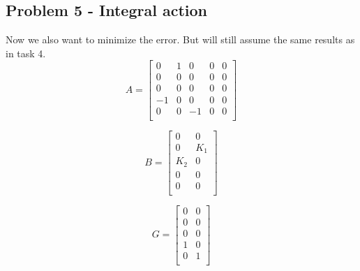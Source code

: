 \subsection{Problem 5 - Integral action}
Now we also want to minimize the error. But will still assume the same results as in task 4.
\begin{equation*}
    A =
    \begin{bmatrix}
        0 & 1 & 0 & 0 & 0 \\
        0 & 0 & 0 & 0 & 0 \\
        0 & 0 & 0 & 0 & 0 \\
        -1 & 0 & 0 & 0 & 0 \\
        0 & 0 & -1 & 0 & 0 \\
    \end{bmatrix}
\end{equation*}

\begin{equation*}
    B =
    \begin{bmatrix}
        0 & 0 \\
        0 & K_1 \\
        K_2 & 0 \\
        0 & 0 \\
        0 & 0 \\
    \end{bmatrix}
\end{equation*}

\begin{equation*}
    G =
    \begin{bmatrix}
        0 & 0 \\
        0 & 0 \\
        0 & 0 \\
        1 & 0 \\
        0 & 1 \\
    \end{bmatrix}
\end{equation*}
